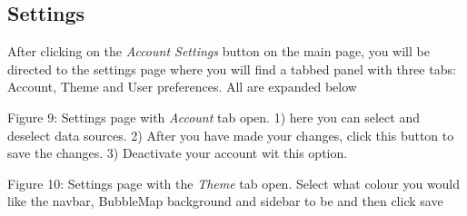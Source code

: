 \documentclass[hidelinks,english]{article}
\begin{document}
    \subsection{Settings}
        After clicking on the \textit{Account Settings} button on the main page, you will be directed to the settings page where you will find a tabbed panel with three tabs: Account, Theme and User preferences. All are expanded below
     \begin{center}
      Figure 9: Settings page with \textit{Account} tab open. 1) here you can select and deselect data sources. 2) After you have made your changes, click this button to save the changes. 3) Deactivate your account wit this option.
      \label{settings page 1}
    \end{center}
    \begin{center}
      Figure 10: Settings page with the \textit{Theme} tab open. Select what colour you would like the navbar, BubbleMap background and sidebar to be and then click save
      \label{settings page 2}
    \end{center}
\end{document}
